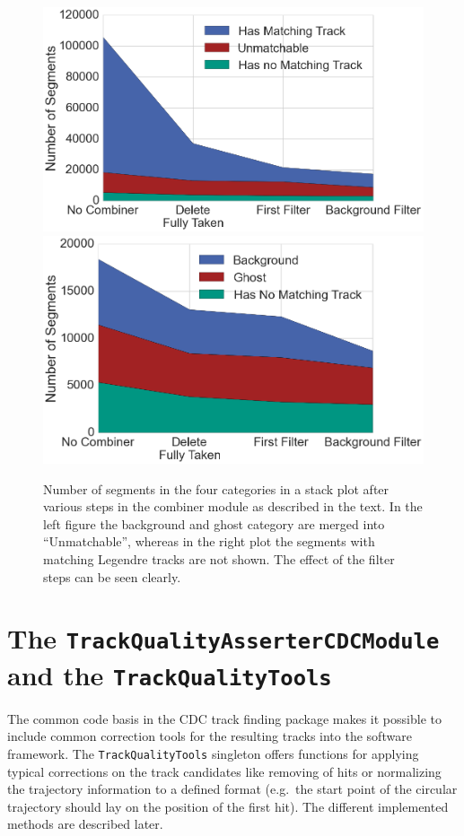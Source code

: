 \begin{figure}
  \centering
  \includegraphics[width=0.48\linewidth]{figures/workflow/remaining_segments_full.png}
  \includegraphics[width=0.48\linewidth]{figures/workflow/remaining_segments_detail.png}
  \caption{Number of segments in the four categories in a stack plot after various steps in the combiner module as described in the text. In the left figure the background and ghost category are merged into ``Unmatchable'', whereas in the right plot the segments with matching Legendre tracks are not shown. The effect of the filter steps can be seen clearly.}
  \label{fig-remaining-segments-full}
\end{figure}


\section{The \texttt{Track\-Quality\-Asserter\-CDC\-Module} and the \texttt{Track\-Quality\-Tools}}  \label{section-quality}

The common code basis in the CDC track finding package makes it possible to include common correction tools for the resulting tracks into the software framework. The \texttt{TrackQualityTools} singleton offers functions for applying typical corrections on the track candidates like removing of hits or normalizing the trajectory information to a defined format (e.g.\ the start point of the circular trajectory should lay on the position of the first hit). The different implemented methods are described later.

